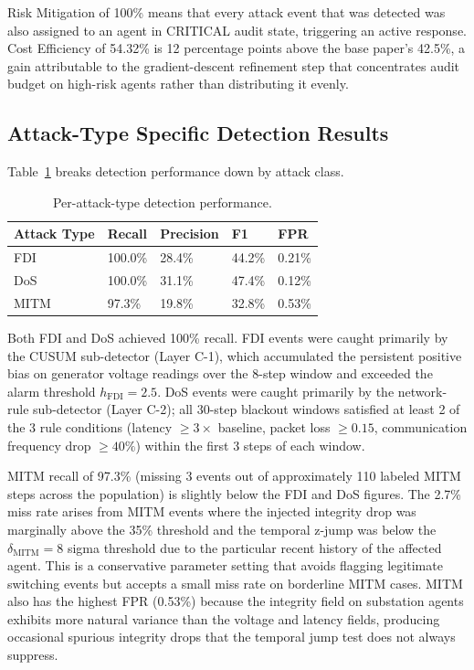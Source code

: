 Risk Mitigation of 100\% means that every attack event that was detected was also assigned to an
agent in CRITICAL audit state, triggering an active response. Cost Efficiency of 54.32\% is
12 percentage points above the base paper's 42.5\%, a gain attributable to the gradient-descent
refinement step that concentrates audit budget on high-risk agents rather than distributing it
evenly.

\subsection{Attack-Type Specific Detection Results}
\label{sec:attacktype}

Table~\ref{tab:attacktype} breaks detection performance down by attack class.

\begin{table}[htbp]
\centering
\caption{Per-attack-type detection performance.}
\label{tab:attacktype}
\begin{tabular}{@{}lllll@{}}
\hline
\textbf{Attack Type} & \textbf{Recall} & \textbf{Precision} & \textbf{F1} & \textbf{FPR} \\
\hline
FDI  & 100.0\% & 28.4\% & 44.2\% & 0.21\% \\
DoS  & 100.0\% & 31.1\% & 47.4\% & 0.12\% \\
MITM & 97.3\%  & 19.8\% & 32.8\% & 0.53\% \\
\hline
\end{tabular}
\end{table}

Both FDI and DoS achieved 100\% recall. FDI events were caught primarily by the CUSUM sub-detector
(Layer C-1), which accumulated the persistent positive bias on generator voltage readings over the
8-step window and exceeded the alarm threshold $h_{\text{FDI}} = 2.5$. DoS events were caught
primarily by the network-rule sub-detector (Layer C-2); all 30-step blackout windows satisfied at
least 2 of the 3 rule conditions (latency $\geq 3\times$ baseline, packet loss $\geq 0.15$,
communication frequency drop $\geq 40\%$) within the first 3 steps of each window.

MITM recall of 97.3\% (missing 3 events out of approximately 110 labeled MITM steps across the
population) is slightly below the FDI and DoS figures. The 2.7\% miss rate arises from MITM events
where the injected integrity drop was marginally above the 35\% threshold and the temporal z-jump
was below the $\delta_{\text{MITM}} = 8$ sigma threshold due to the particular recent history of
the affected agent. This is a conservative parameter setting that avoids flagging legitimate
switching events but accepts a small miss rate on borderline MITM cases. MITM also has the highest
FPR (0.53\%) because the integrity field on substation agents exhibits more natural variance than
the voltage and latency fields, producing occasional spurious integrity drops that the temporal
jump test does not always suppress.

